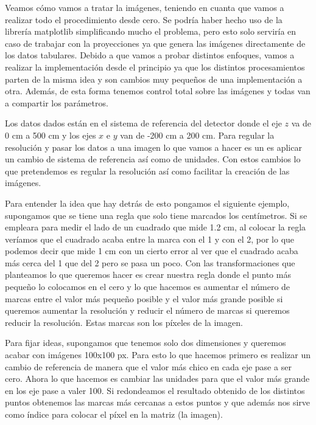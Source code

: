 \documentclass[a4paper,12pt,twoside,titlepage]{article}
\begin{document}
Veamos cómo vamos a tratar la imágenes, teniendo en cuanta que vamos a realizar todo el procedimiento desde cero. Se podría haber hecho uso de la librería matplotlib simplificando mucho el problema, pero esto solo serviría en caso de trabajar con la proyecciones ya que genera las imágenes directamente de los datos tabulares. Debido a que vamos a probar distintos enfoques, vamos a realizar la implementación desde el principio ya que los distintos procesamientos parten de la misma idea y son cambios muy pequeños de una implementación a otra. Además, de esta forma tenemos control total sobre las imágenes y todas van a compartir los parámetros.

Los datos dados están en el sistema de referencia del detector donde el eje $z$ va de 0 cm a 500 cm y los ejes $x$ e $y$ van de -200 cm a 200 cm. Para regular la resolución y pasar los datos a una imagen lo que vamos a hacer es un es aplicar un cambio de sistema de referencia así como de unidades. Con estos cambios lo que pretendemos es regular la resolución así como facilitar la creación de las imágenes.

Para entender la idea que hay detrás de esto pongamos el siguiente ejemplo, supongamos que se tiene una regla que solo tiene marcados los centímetros. Si se empleara para medir el lado de un cuadrado que mide 1.2 \si[]{cm}, al colocar la regla veríamos que el cuadrado acaba entre la marca con el 1 y con el 2, por lo que podemos decir que mide 1 \si[]{cm} con un cierto error al ver que el cuadrado acaba más cerca del 1 que del 2 pero se pasa un poco. Con las transformaciones que planteamos lo que queremos hacer es crear nuestra regla donde el punto más pequeño lo colocamos en el cero y lo que hacemos es aumentar el número de marcas entre el valor más pequeño posible y el valor más grande posible si queremos aumentar la resolución y reducir el número de marcas si queremos reducir la resolución. Estas marcas son los píxeles de la imagen.

Para fijar ideas, supongamos que tenemos solo dos dimensiones y queremos acabar con imágenes 100x100 px. Para esto lo que hacemos primero es realizar un cambio de referencia de manera que el valor más chico en cada eje pase a ser cero. Ahora lo que hacemos es cambiar las unidades para que el valor más grande en los eje pase a valer 100. Si redondeamos el resultado obtenido de los distintos puntos obtenemos las marcas más cercanas a estos puntos y que además nos sirve como índice para colocar el píxel en la matriz (la imagen).
\end{document}
